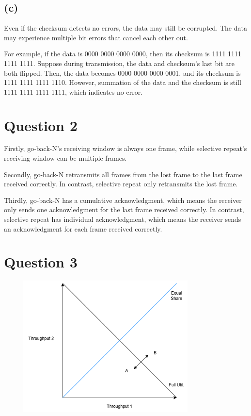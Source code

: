 \documentclass[a4paper,12pt]{article}
\begin{document}
\subsection*{(c)}

Even if the checksum detects no errors, the data may still be corrupted. The data may experience multiple bit errors that cancel each other out. 

For example, if the data is 0000 0000 0000 0000, then its checksum is 1111 1111 1111 1111. Suppose during transmission, the data and checksum's last bit are both flipped. Then, the data becomes 0000 0000 0000 0001, and its checksum is 1111 1111 1111 1110. However, summation of the data and the checksum is still 1111 1111 1111 1111, which indicates no error.

\section*{Question 2}

Firstly, go-back-N's receiving window is always one frame, while selective repeat's receiving window can be multiple frames. 

Secondly, go-back-N retransmits all frames from the lost frame to the last frame received correctly. In contrast, selective repeat only retransmits the lost frame.

Thirdly, go-back-N has a cumulative acknowledgment, which means the receiver only sends one acknowledgment for the last frame received correctly. In contrast, selective repeat has individual acknowledgment, which means the receiver sends an acknowledgment for each frame received correctly.

\section*{Question 3}

\begin{figure}[H]
  \centering
  \includegraphics[width=0.8\textwidth]{figure/AIAD.drawio.png}
\end{figure}
\end{document}
